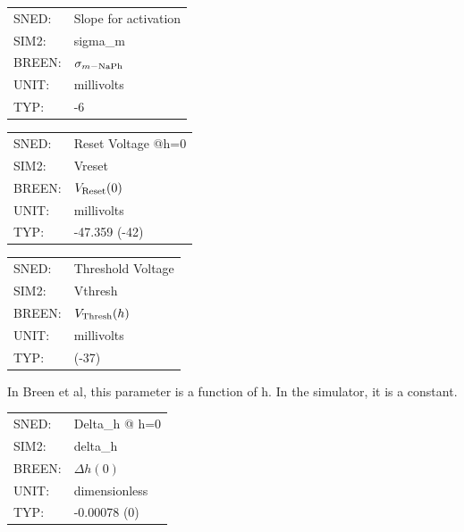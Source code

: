 \documentclass[12pt,openany,oneside]{book}
\begin{document}
\begin{flushleft}
\begin{tabular}{@{}ll@{}}
SNED: & Slope for activation\\
SIM2: & sigma\_m\\
BREEN: & $\sigma_{m-\rm NaPh}$\\
UNIT: & millivolts\\
TYP: & -6\\
\end{tabular}
\end{flushleft}
\filbreak
\vspace{\baselineskip}

\begin{flushleft}
\begin{tabular}{@{}ll@{}}
SNED: & Reset Voltage @h=0\\
SIM2: & Vreset\\
BREEN: & $V_{\rm Reset}(0)$\\
UNIT: & millivolts\\
TYP: & -47.359 (-42)\\
\end{tabular}
\end{flushleft}
\filbreak
\vspace{\baselineskip}

\begin{flushleft}
\begin{tabular}{@{}ll@{}}
SNED: & Threshold Voltage\\
SIM2: & Vthresh\\
BREEN: & $V_{\rm Thresh}(h)$\\
UNIT: & millivolts\\
TYP: & (-37)\\
\end{tabular}
\end{flushleft}
\noindent In Breen et al, this parameter is a function of h.  In the simulator,
it is a constant.
\filbreak
\vspace{2\baselineskip}

\begin{flushleft}
\begin{tabular}{@{}ll@{}}
SNED: & Delta\_h @ h=0\\
SIM2: & delta\_h\\
BREEN: & $\Delta h(0)$\\
UNIT: & dimensionless\\
TYP: & -0.00078 (0)\\
\end{tabular}
\end{flushleft}
\noindent
\filbreak
\vspace{\baselineskip}
\end{document}
